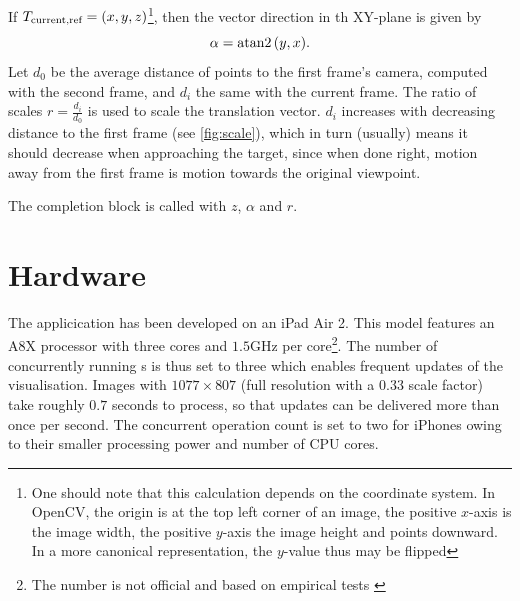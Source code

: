 If $T_{\text{current,ref}} = (x,y,z)$\footnote{One should note that this
   calculation depends on the coordinate system. In OpenCV, the origin is at the
   top left corner of an image, the positive $x$-axis is the image width, the
   positive $y$-axis the image height and points downward. In a more canonical
representation, the $y$-value thus may be flipped}, then the vector direction
in th XY-plane is given by 
\begin{equation*}
   \alpha = \atan2{(y,x)}.
\end{equation*}
Let $d_0$ be the average distance of points to the first frame's camera,
computed with the second frame, and $d_i$ the same with the current frame. The
ratio of scales $r=\frac{d_i}{d_0}$ is used to scale the translation vector. $d_i$
increases with decreasing distance to the first frame (see \autoref{fig:scale}),
which in turn (usually) means it should decrease when approaching the target,
since when done right, motion away from the first frame is motion towards the
original viewpoint.

The completion block is called with $z$, $\alpha$ and $r$.


\section{Hardware}

The applicication has been developed on an iPad Air 2. This model features an
A8X processor with three cores and $1.5$GHz per core\footnote{The number is not
official and based on empirical tests \citep{a8x}}. The number of concurrently
running s is thus set to three which
enables frequent updates of the visualisation. Images with $1077\times 807$
(full resolution with a $0.33$ scale factor) take roughly $0.7$ seconds to
process, so that updates can be delivered more than once per second. The
concurrent operation count is set to two for iPhones owing to their smaller
processing power and number of CPU cores.
